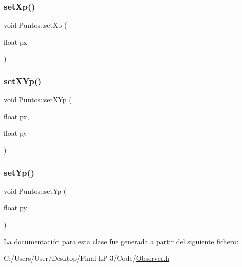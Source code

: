 \mbox{\label{class_puntos_a500e4016c0aa68362c2dc1161e1b2a27}} 
\subsubsection{\texorpdfstring{setXp()}{setXp()}}
{\footnotesize\ttfamily void Puntos\+::set\+Xp (\begin{DoxyParamCaption}\item[{float}]{px }\end{DoxyParamCaption})\hspace{0.3cm}{\ttfamily [inline]}}

\mbox{\label{class_puntos_af2adca108176e9ee64237ad1c4b85f78}} 
\subsubsection{\texorpdfstring{setXYp()}{setXYp()}}
{\footnotesize\ttfamily void Puntos\+::set\+X\+Yp (\begin{DoxyParamCaption}\item[{float}]{px,  }\item[{float}]{py }\end{DoxyParamCaption})\hspace{0.3cm}{\ttfamily [inline]}}

\mbox{\label{class_puntos_a657ead3e6df8a67babe339b3c3d63588}} 
\subsubsection{\texorpdfstring{setYp()}{setYp()}}
{\footnotesize\ttfamily void Puntos\+::set\+Yp (\begin{DoxyParamCaption}\item[{float}]{py }\end{DoxyParamCaption})\hspace{0.3cm}{\ttfamily [inline]}}



La documentación para esta clase fue generada a partir del siguiente fichero\+:\begin{DoxyCompactItemize}
\item 
C\+:/\+Users/\+User/\+Desktop/\+Final L\+P-\/3/\+Code/\mbox{\hyperlink{_observer_8h}{Observer.\+h}}\end{DoxyCompactItemize}
